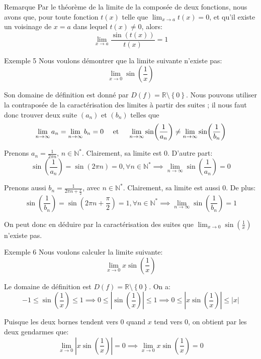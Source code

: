 \documentclass[a4paper]{article}
\begin{document}
\begin{parag}{Remarque}
    Par le théorème de la limite de la composée de deux fonctions, nous avons que, pour toute fonction $t\left(x\right)$ telle que $\lim_{x \to a} t\left(x\right) = 0$, et qu'il existe un voisinage de $x = a$ dans lequel $t\left(x\right) \neq 0$, alors:
    \[\lim_{x \to a} \frac{\sin\left(t\left(x\right)\right)}{t\left(x\right)} = 1\]
\end{parag}

\begin{parag}{Exemple 5}
    Nous voulons démontrer que la limite suivante n'existe pas:
    \[\lim_{x \to 0} \sin\left(\frac{1}{x}\right)\]

    Son domaine de définition est donné par $D\left(f\right) = \mathbb{R} \setminus \left\{0\right\}$. Nous pouvons utiliser la contraposée de la caractérisation des limites à partir des suites ; il nous faut donc trouver deux suite $\left(a_n\right)$ et $\left(b_n\right)$ telles que
    \[\lim_{n \to \infty} a_n = \lim_{n \to \infty} b_n = 0 \mathspace \text{ et } \mathspace \lim_{n \to \infty} \sin\left(\frac{1}{a_n}\right) \neq \lim_{n \to \infty} \sin\left(\frac{1}{b_n}\right)\]

    Prenons $a_n = \frac{1}{2\pi n}$, $n \in \mathbb{N}^*$. Clairement, sa limite est 0. D'autre part:
    \[\sin\left(\frac{1}{a_n}\right) = \sin\left(2\pi n\right) = 0, \forall n \in \mathbb{N}^* \implies \lim_{n \to \infty} \sin\left(\frac{1}{a_n}\right) = 0\]

    Prenons aussi $b_n = \frac{1}{2\pi n + \frac{\pi}{2}}$, avec $n \in \mathbb{N}^*$. Clairement, sa limite est aussi 0. De plus:
    \[\sin\left(\frac{1}{b_n}\right) = \sin\left(2\pi n + \frac{\pi}{2}\right) = 1, \forall n \in \mathbb{N}^* \implies \lim_{n \to \infty} \sin\left(\frac{1}{b_n}\right) = 1\]

    On peut donc en déduire par la caractérisation des suites que $\lim_{x \to 0} \sin\left(\frac{1}{x}\right)$ n'existe pas.

\end{parag}

\begin{parag}{Exemple 6}
    Nous voulons calculer la limite suivante:
    \[\lim_{x \to 0} x \sin\left(\frac{1}{x}\right)\]

    Le domaine de définition est $D\left(f\right) = \mathbb{R} \setminus \left\{0\right\}$. On a:
    \[-1 \leq \sin\left(\frac{1}{x}\right) \leq 1 \implies 0 \leq \left|\sin\left(\frac{1}{x}\right)\right| \leq 1 \implies 0 \leq \left|x \sin\left(\frac{1}{x}\right)\right| \leq \left|x\right|\]

    Puisque les deux bornes tendent vers 0 quand $x$ tend vers 0, on obtient par les deux gendarmes que:
    \[\lim_{x \to 0} \left|x\sin\left(\frac{1}{x}\right)\right| = 0 \implies \lim_{x \to 0} x\sin\left(\frac{1}{x}\right) = 0\]
\end{parag}
\end{document}
